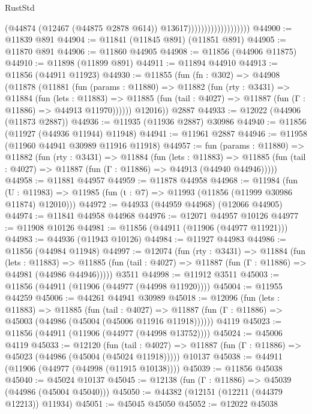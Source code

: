 \begin{lexlean}{RustStd}
\begin{coremodule}
                                        (@44874
                                          (@12467 (@44875 @2878 @614))
                                          @13617)))))))))))))))))))
@44900 := @11839 @891
@44904 := @11841 (@11845 @891) (@11851 @891)
@44905 := @11870 @891
@44906 := @11860 @44905
@44908 := @11856 (@44906 @11875)
@44910 := @11898 (@11899 @891)
@44911 := @11894 @44910
@44913 := @11856 (@44911 @11923)
@44930 := @11855
    (fun (fn : @302) =>
    @44908
      (@11878
        (@11881
          (fun (params : @11880) =>
          @11882
            (fun (rty : @3431) =>
            @11884
              (fun (lets : @11883) =>
              @11885 (fun (tail : @4027) => @11887 (fun (Γ : @11886) => @44913 @11970))))))
        @12016))
    @2887
@44933 := @12022 (@44906 (@11873 @2887))
@44936 := @11935 (@11936 @2887) @30986
@44940 := @11856 (@11927 (@44936 @11944) @11948)
@44941 := @11961 @2887
@44946 := @11958 (@11960 @44941 @30989 @11916 @11918)
@44957 := fun (params : @11880) =>
  @11882
    (fun (rty : @3431) =>
    @11884
      (fun (lets : @11883) =>
      @11885 (fun (tail : @4027) => @11887 (fun (Γ : @11886) => @44913 (@44940 @44946)))))
@44958 := @11881 @44957
@44959 := @11878 @44958
@44968 := @11984
    (fun (U : @11983) => @11985 (fun (t : @7) => @11993 (@11856 (@11999 @30986 @11874) @12010)))
@44972 := @44933 (@44959 @44968) (@12066 @44905)
@44974 := @11841 @44958 @44968
@44976 := @12071 @44957 @10126
@44977 := @11908 @10126
@44981 := @11856 (@44911 (@11906 (@44977 @11921)))
@44983 := @44936 (@11943 @10126)
@44984 := @11927 @44983
@44986 := @11856 (@44984 @11948)
@44997 := @12074
    (fun (rty : @3431) =>
    @11884
      (fun (lets : @11883) =>
      @11885 (fun (tail : @4027) => @11887 (fun (Γ : @11886) => @44981 (@44986 @44946)))))
    @3511
@44998 := @11912 @3511
@45003 := @11856 (@44911 (@11906 (@44977 (@44998 @11920))))
@45004 := @11955 @44259
@45006 := @44261 @44941 @30989
@45018 := @12096
    (fun (lets : @11883) =>
    @11885
      (fun (tail : @4027) =>
      @11887 (fun (Γ : @11886) => @45003 (@44986 (@45004 (@45006 @11916 @11918))))))
    @4119
@45023 := @11856 (@44911 (@11906 (@44977 (@44998 @13752))))
@45024 := @45006 @4119
@45033 := @12120
    (fun (tail : @4027) => @11887 (fun (Γ : @11886) => @45023 (@44986 (@45004 (@45024 @11918)))))
    @10137
@45038 := @44911 (@11906 (@44977 (@44998 (@11915 @10138))))
@45039 := @11856 @45038
@45040 := @45024 @10137
@45045 := @12138 (fun (Γ : @11886) => @45039 (@44986 (@45004 @45040)))
@45050 := @44382 (@12151 (@12211 (@44379 @12213)) @11934)
@45051 := @45045 @45050
@45052 := @12022 @45038

\end{coremodule}
\end{lexlean}
